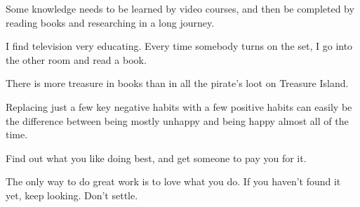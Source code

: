 \documentclass[12pt, dvipsnames, svgnames, x11names, oneside]{book}
\begin{document}
	
	\frontmatter
	\tableofcontents
	\clearpage
	
	\mainmatter		
	
	\begin{savequote}[80mm]
		Some knowledge needs to be learned by video courses, and then be completed by reading books and researching in a long journey.
	\end{savequote}
		
	
	\begin{savequote}[80mm]
		I find television very educating. Every time somebody turns on the set, I go into the other room and read a book.
		
		There is more treasure in books than in all the pirate’s loot on Treasure Island.
	\end{savequote}
		
	
	\begin{savequote}[80mm]
		Replacing just a few key negative habits with a few positive habits can easily be the difference between being mostly unhappy and being happy almost all of the time.
	\end{savequote}
	
	
	\begin{savequote}[80mm]
		Find out what you like doing best, and get someone to pay you for it.
		
		The only way to do great work is to love what you do. If you haven't found it yet, keep looking. Don't settle.
	\end{savequote}
	
\end{document}

